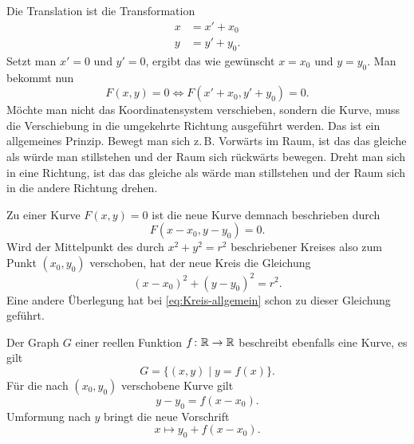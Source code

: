 Die Translation ist die Transformation
\begin{equation}
\begin{split}
x &= x'+x_0\\
y &= y'+y_0.
\end{split}
\end{equation}
Setzt man $x'=0$ und $y'=0$, ergibt das wie gewünscht
$x=x_0$ und $y=y_0$. Man bekommt nun
\begin{equation}
F(x,y)=0 \iff F(x'+x_0, y'+y_0)=0.
\end{equation}
Möchte man nicht das Koordinatensystem verschieben, sondern
die Kurve, muss die Verschiebung in die umgekehrte Richtung
ausgeführt werden. Das ist ein allgemeines Prinzip. Bewegt man
sich z.\,B. Vorwärts im Raum, ist das das gleiche als würde man
stillstehen und der Raum sich rückwärts bewegen. Dreht man sich
in eine Richtung, ist das das gleiche als wärde man stillstehen
und der Raum sich in die andere Richtung drehen.

Zu einer Kurve $F(x,y)=0$ ist die neue Kurve demnach beschrieben
durch%
\begin{equation}
F(x-x_0, y-y_0) = 0.
\end{equation}
Wird der Mittelpunkt des durch $x^2+y^2=r^2$ beschriebener Kreises
also zum Punkt $(x_0,y_0)$ verschoben, hat der neue Kreis die
Gleichung
\begin{equation}
(x-x_0)^2 + (y-y_0)^2 = r^2.
\end{equation}
Eine andere Überlegung hat bei \eqref{eq:Kreis-allgemein}
schon zu dieser Gleichung geführt.

Der Graph $G$ einer reellen Funktion $f\colon\mathbb R\to\mathbb R$ beschreibt
ebenfalls eine Kurve, es gilt
\begin{equation}
G = \{(x,y)\mid y=f(x)\}.
\end{equation}
Für die nach $(x_0,y_0)$ verschobene Kurve gilt
\begin{equation}
y-y_0 = f(x-x_0).
\end{equation}
Umformung nach $y$ bringt die neue Vorschrift
\begin{equation}
x\mapsto y_0+f(x-x_0).
\end{equation}




